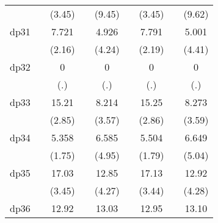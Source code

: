 {\begin{tabular}{l*{8}{c}}
            &                     &      (3.45)         &                     &      (9.45)         &                     &      (3.45)         &                     &      (9.62)         \\
[1em]
dp31        &                     &       7.721\sym{*}  &                     &       4.926\sym{***}&                     &       7.791\sym{*}  &                     &       5.001\sym{***}\\
            &                     &      (2.16)         &                     &      (4.24)         &                     &      (2.19)         &                     &      (4.41)         \\
[1em]
dp32        &                     &           0         &                     &           0         &                     &           0         &                     &           0         \\
            &                     &         (.)         &                     &         (.)         &                     &         (.)         &                     &         (.)         \\
[1em]
dp33        &                     &       15.21\sym{**} &                     &       8.214\sym{***}&                     &       15.25\sym{**} &                     &       8.273\sym{***}\\
            &                     &      (2.85)         &                     &      (3.57)         &                     &      (2.86)         &                     &      (3.59)         \\
[1em]
dp34        &                     &       5.358         &                     &       6.585\sym{***}&                     &       5.504         &                     &       6.649\sym{***}\\
            &                     &      (1.75)         &                     &      (4.95)         &                     &      (1.79)         &                     &      (5.04)         \\
[1em]
dp35        &                     &       17.03\sym{***}&                     &       12.85\sym{***}&                     &       17.13\sym{***}&                     &       12.92\sym{***}\\
            &                     &      (3.45)         &                     &      (4.27)         &                     &      (3.44)         &                     &      (4.28)         \\
[1em]
dp36        &                     &       12.92\sym{***}&                     &       13.03\sym{***}&                     &       12.95\sym{***}&                     &       13.10\sym{***}\\

\end{tabular}}
